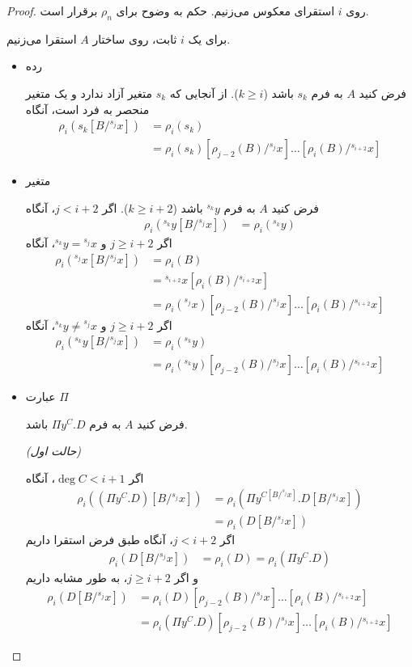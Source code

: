 \begin{proof}
روی
$i$
استقرای معکوس می‌زنیم.
حکم به وضوح برای
$\rho_n$
برقرار است.

برای یک
$i$
ثابت، روی ساختار
$A$
استقرا می‌زنیم.

\begin{itemize}
\item رده

فرض کنید
$A$
به فرم
$s_k$
باشد
($k \ge i$).
از آنجایی که
$s_k$
متغیر آزاد ندارد و
یک متغیر منحصر به فرد است، آنگاه
\begin{align*}
\rho_i(s_k[B/{}^{s_j}x]) &= \rho_i(s_k) \\ &= \rho_i(s_k)[\rho_{j-2}(B)/{}^{s_j}x] \dots [\rho_{i}(B)/{}^{s_{i+2}}x]
\end{align*}

\item متغیر

فرض کنید
$A$
به فرم
${}^{s_k}y$
باشد
($k \ge i + 2$).
اگر
$j < i + 2$،
آنگاه
\begin{align*}
\rho_i({}^{s_k}y[B/{}^{s_j}x]) &= \rho_i({}^{s_k}y)
\end{align*}
اگر
$j \ge i + 2$ و ${}^{s_k}y = {}^{s_j}x$،
آنگاه
\begin{align*}
\rho_i({}^{s_j}x[B/{}^{s_j}x]) 
&= \rho_i(B) \\ 
&= {}^{s_{i+2}}x [\rho_i(B)/{}^{s_{i+2}}x] \\
&= \rho_i({}^{s_j}x)[\rho_{j-2}(B)/{}^{s_j}x] \dots [\rho_{i}(B)/{}^{s_{i+2}}x]
\end{align*}
اگر
$j \ge i + 2$ و ${}^{s_k}y \neq {}^{s_j}x$،
آنگاه
\begin{align*}
\rho_i({}^{s_k}y[B/{}^{s_j}x]) 
&= \rho_i({}^{s_k}y) \\ 
&= \rho_i({}^{s_k}y)[\rho_{j-2}(B)/{}^{s_j}x] \dots [\rho_{i}(B)/{}^{s_{i+2}}x]
\end{align*}

\item عبارت $\Pi$

فرض کنید
$A$
به فرم
$\Pi y^C.D$
باشد.

\textit{(حالت اول)}

اگر
$\operatorname{deg} C < i + 1$،
آنگاه
\begin{align*}
\rho_i((\Pi y^C.D)[B/{}^{s_j}x]) 
&= \rho_i(\Pi y^{C[B/{}^{s_j}x]}.D[B/{}^{s_j}x]) \\ 
&= \rho_i(D[B/{}^{s_j}x])
\end{align*}
اگر
$j < i + 2$،
آنگاه طبق فرض استقرا داریم
\begin{align*}
\rho_i(D[B/{}^{s_j}x]) &= \rho_i(D) = \rho_i(\Pi y^C.D)
\end{align*}
و اگر
$j \ge i + 2$،
به طور مشابه داریم
\begin{align*}
\rho_i(D[B/{}^{s_j}x]) 
&= \rho_i(D)[\rho_{j-2}(B)/{}^{s_j}x] \dots [\rho_{i}(B)/{}^{s_{i+2}}x] \\
&= \rho_i(\Pi y^C.D)[\rho_{j-2}(B)/{}^{s_j}x] \dots [\rho_{i}(B)/{}^{s_{i+2}}x]
\end{align*}


\end{itemize}
\end{proof}
